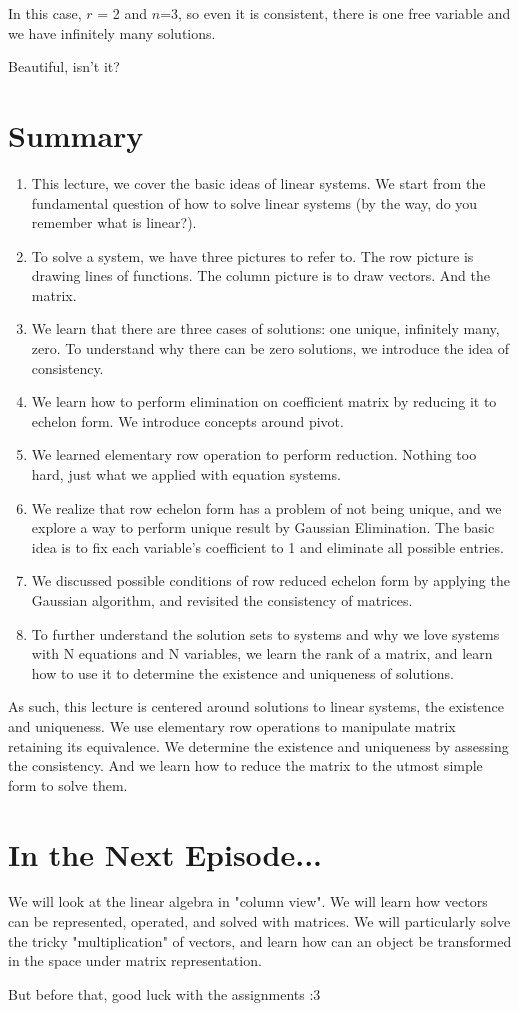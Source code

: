 \documentclass[11pt]{article}
\theoremstyle{definition}
\begin{document}
In this case, $r$ = 2 and $n$=3, so even it is consistent, there is one free variable and we have infinitely many solutions.

Beautiful, isn't it?

\section{Summary}

\begin{enumerate}
    \item This lecture, we cover the basic ideas of linear systems. We start from the fundamental question of how to solve linear systems (by the way, do you remember what is linear?). 
    \item To solve a system, we have three pictures to refer to. The row picture is drawing lines of functions. The column picture is to draw vectors. And the matrix.
    \item We learn that there are three cases of solutions: one unique, infinitely many, zero. To understand why there can be zero solutions, we introduce the idea of consistency.
    \item We learn how to perform elimination on coefficient matrix by reducing it to echelon form. We introduce concepts around pivot.
    \item We learned elementary row operation to perform reduction. Nothing too hard, just what we applied with equation systems.
    \item We realize that row echelon form has a problem of not being unique, and we explore a way to perform unique result by Gaussian Elimination. The basic idea is to fix each variable's coefficient to 1 and eliminate all possible entries.
    \item We discussed possible conditions of row reduced echelon form by applying the Gaussian algorithm, and revisited the consistency of matrices.
    \item To further understand the solution sets to systems and why we love systems with N equations and N variables, we learn the rank of a matrix, and learn how to use it to determine the existence and uniqueness of solutions. 

\end{enumerate}


As such, this lecture is centered around solutions to linear systems, the existence and uniqueness. We use elementary row operations to manipulate matrix retaining its equivalence. We determine the existence and uniqueness by assessing the consistency. And we learn how to reduce the matrix to the utmost simple form to solve them.

\section{In the Next Episode...}
We will look at the linear algebra in "column view". We will learn how vectors can be represented, operated, and solved with matrices. We will particularly solve the tricky "multiplication" of vectors, and learn how can an object be transformed in the space under matrix representation. 

But before that, good luck with the assignments :3
\end{document}
